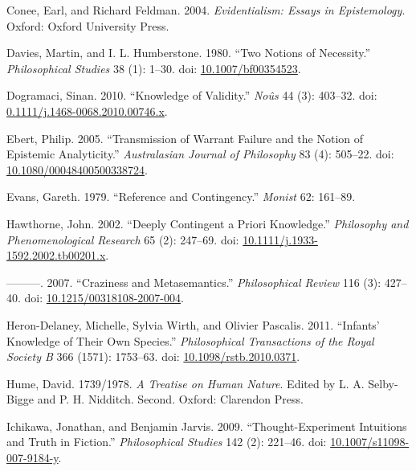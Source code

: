 \documentclass[
  11pt,
  letterpaper,
  DIV=11,
  numbers=noendperiod,
  twoside]{scrartcl}
\newlength{\cslhangindent}
\newenvironment{CSLReferences}[2] %
 {\begin{list}{}{%
  \setlength{\itemindent}{0pt}
  \setlength{\leftmargin}{0pt}
  \setlength{\parsep}{0pt}
  \ifodd #1
   \setlength{\leftmargin}{\cslhangindent}
   \setlength{\itemindent}{-1\cslhangindent}
  \fi
  \setlength{\itemsep}{#2\baselineskip}}}
 {\end{list}}
\begin{document}
\begin{CSLReferences}{1}{0}
Conee, Earl, and Richard Feldman. 2004. \emph{Evidentialism: Essays in
Epistemology}. Oxford: Oxford University Press.

Davies, Martin, and I. L. Humberstone. 1980. {``Two Notions of
Necessity.''} \emph{Philosophical Studies} 38 (1): 1--30. doi:
\href{https://doi.org/10.1007/bf00354523}{10.1007/bf00354523}.

Dogramaci, Sinan. 2010. {``Knowledge of Validity.''} \emph{No{û}s} 44
(3): 403--32. doi:
\href{https://doi.org/0.1111/j.1468-0068.2010.00746.x}{0.1111/j.1468-0068.2010.00746.x}.

Ebert, Philip. 2005. {``Transmission of Warrant Failure and the Notion
of Epistemic Analyticity.''} \emph{Australasian Journal of Philosophy}
83 (4): 505--22. doi:
\href{https://doi.org/10.1080/00048400500338724}{10.1080/00048400500338724}.

Evans, Gareth. 1979. {``Reference and Contingency.''} \emph{Monist} 62:
161--89.

Hawthorne, John. 2002. {``Deeply Contingent a Priori Knowledge.''}
\emph{Philosophy and Phenomenological Research} 65 (2): 247--69. doi:
\href{https://doi.org/10.1111/j.1933-1592.2002.tb00201.x}{10.1111/j.1933-1592.2002.tb00201.x}.

---------. 2007. {``Craziness and Metasemantics.''} \emph{Philosophical
Review} 116 (3): 427--40. doi:
\href{https://doi.org/10.1215/00318108-2007-004}{10.1215/00318108-2007-004}.

Heron-Delaney, Michelle, Sylvia Wirth, and Olivier Pascalis. 2011.
{``Infants' Knowledge of Their Own Species.''} \emph{Philosophical
Transactions of the Royal Society B} 366 (1571): 1753--63. doi:
\href{https://doi.org/10.1098/rstb.2010.0371}{10.1098/rstb.2010.0371}.

Hume, David. 1739/1978. \emph{A Treatise on Human Nature}. Edited by L.
A. Selby-Bigge and P. H. Nidditch. Second. Oxford: Clarendon Press.

Ichikawa, Jonathan, and Benjamin Jarvis. 2009. {``Thought-Experiment
Intuitions and Truth in Fiction.''} \emph{Philosophical Studies} 142
(2): 221--46. doi:
\href{https://doi.org/10.1007/s11098-007-9184-y}{10.1007/s11098-007-9184-y}.


\end{CSLReferences}
\end{document}
